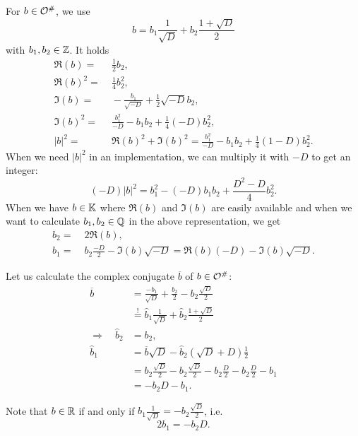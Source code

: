\label{impl:repr:curlOdual}

For $b \in \mathcal{O}^\#$, we use
\[ b = b_1 \frac{1}{\sqrt{D}} + b_2 \frac{1 + \sqrt{D}} {2} \]
with $b_1,b_2 \in \mathbb{Z}$.
It holds
\begin{align*}
\Re(b) = &\; \frac{1}{2} b_2, \\
\Re(b)^2 = &\; \frac{1}{4} b_2^2, \\
\Im(b) = &\; -\frac{b_1}{\sqrt{-D}} + \frac{1}{2} \sqrt{-D} b_2, \\
\Im(b)^2 = &\; \frac{b_1^2}{-D} - b_1 b_2 + \frac{1}{4} (-D) b_2^2, \\
|b|^2 = &\; \Re(b)^2 + \Im(b)^2 = \frac{b_1^2}{-D} - b_1 b_2 + \frac{1}{4} (1-D) b_2^2 .
\end{align*}
When we need $|b|^2$ in an implementation, we can multiply it with $-D$ to get an integer:
\[ (-D) |b|^2 = b_1^2 - (-D) b_1 b_2 + \frac{D^2-D}{4} b_2^2 . \]
%
When we have $b \in \mathbb{K}$ where $\Re(b)$ and $\Im(b)$ are easily available and when we want to calculate $b_1,b_2 \in \mathbb{Q}$ in the above representation, we get
\begin{align*}
b_2 =&\; 2 \Re(b) , \\
b_1 =&\; b_2 \frac{-D}{2} - \Im(b) \sqrt{-D} = \Re(b) (-D) - \Im(b) \sqrt{-D} .
\end{align*}

Let us calculate the complex conjugate $\overline{b}$ of $b \in \mathcal{O}^\#$:
\begin{align*}
\overline{b} &= \frac{-b_1}{\sqrt{D}} + \frac{b_2}{2} - b_2 \frac{\sqrt{D}}{2} \\
&\overset{!}{=} \hat{b}_1 \frac{1}{\sqrt{D}} + \hat{b}_2 \frac{1 + \sqrt{D}} {2} \\
\Rightarrow \quad \hat{b}_2 &= b_2 , \\
\hat{b}_1 &= \overline{b} \sqrt{D} - \hat{b}_2 (\sqrt{D}+D) \tfrac{1}{2} \\
&= b_2 \frac{\sqrt{D}}{2} - b_2 \frac{\sqrt{D}}{2} - b_2 \frac{D}{2} - b_2 \frac{D}{2} - b_1 \\
&= -b_2 D - b_1 .
\end{align*}

Note that $b \in \mathbb{R}$ if and only if $b_1 \frac{1}{\sqrt{D}} = - b_2 \frac{\sqrt{D}}{2}$, i.e.
\[ 2 b_1 = - b_2 D . \]

